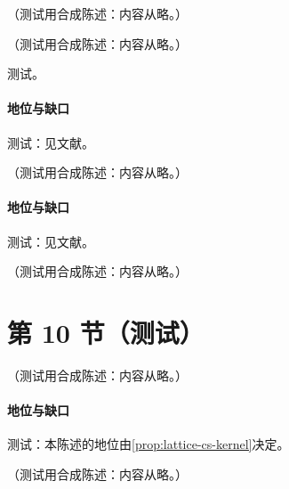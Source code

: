 \begin{example}[阈值因子化的单圈检验]\label{ex:yzliu-threshold-oneloop}
（测试用合成陈述：内容从略。）
\end{example}

\begin{proposition}\label{prop:yzliu-ad-algebra}
（测试用合成陈述：内容从略。）
\end{proposition}
\begin{proofsketch}测试。\end{proofsketch}
\paragraph{地位与缺口}测试：见文献。

\begin{proposition}\label{prop:yzliu-threshold-nnlo}
（测试用合成陈述：内容从略。）
\end{proposition}
\paragraph{地位与缺口}测试：见文献。

\begin{remark}\label{rem:yzliu-threshold-domain}
（测试用合成陈述：内容从略。）
\end{remark}

\section{第 10 节（测试）}\label{sec:yzliu-gpd}

\begin{proposition}\label{prop:yzliu-linear-renormalon}
（测试用合成陈述：内容从略。）
\end{proposition}
\paragraph{地位与缺口}测试：本陈述的地位由\cref{prop:lattice-cs-kernel}决定。

\begin{conjecture}\label{conj:yzliu-renormalon-norm}
（测试用合成陈述：内容从略。）
\end{conjecture}
